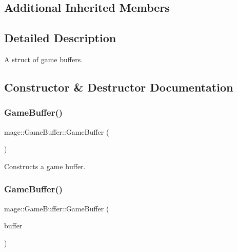 \subsection*{Additional Inherited Members}


\subsection{Detailed Description}
A struct of game buffers. 

\subsection{Constructor \& Destructor Documentation}
\hypertarget{structmage_1_1_game_buffer_ade6ea6f9d04f829d990b848f9e210349}{}\label{structmage_1_1_game_buffer_ade6ea6f9d04f829d990b848f9e210349} 
\subsubsection{\texorpdfstring{Game\+Buffer()}{GameBuffer()}\hspace{0.1cm}{\footnotesize\ttfamily [1/3]}}
{\footnotesize\ttfamily mage\+::\+Game\+Buffer\+::\+Game\+Buffer (\begin{DoxyParamCaption}{ }\end{DoxyParamCaption})}

Constructs a game buffer. \hypertarget{structmage_1_1_game_buffer_a654d6f8d44dcc00b6693840125fb81ff}{}\label{structmage_1_1_game_buffer_a654d6f8d44dcc00b6693840125fb81ff} 
\subsubsection{\texorpdfstring{Game\+Buffer()}{GameBuffer()}\hspace{0.1cm}{\footnotesize\ttfamily [2/3]}}
{\footnotesize\ttfamily mage\+::\+Game\+Buffer\+::\+Game\+Buffer (\begin{DoxyParamCaption}\item[{const \hyperlink{structmage_1_1_game_buffer}{Game\+Buffer} \&}]{buffer }\end{DoxyParamCaption})\hspace{0.3cm}{\ttfamily [default]}}

